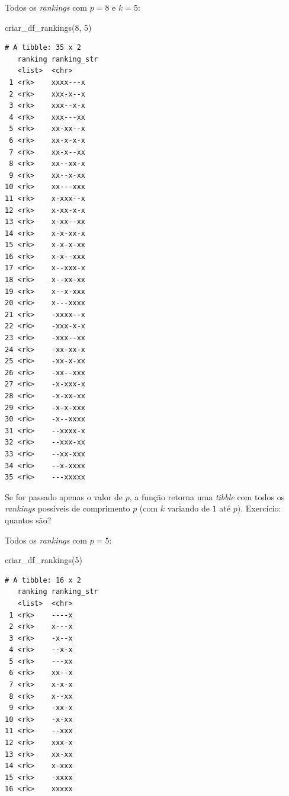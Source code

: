 \documentclass[
  letterpaper,
  DIV=11,
  numbers=noendperiod]{scrreprt}
\newenvironment{Shaded}{\begin{snugshade}}{\end{snugshade}}
\newcommand{\DecValTok}[1]{\textcolor[rgb]{0.68,0.00,0.00}{#1}}
\newcommand{\FunctionTok}[1]{\textcolor[rgb]{0.28,0.35,0.67}{#1}}
\newcommand{\NormalTok}[1]{\textcolor[rgb]{0.00,0.23,0.31}{#1}}
\begin{document}
Todos os \emph{rankings} com $p = 8$ e $k = 5$:

\begin{Shaded}
\begin{Highlighting}[]
\FunctionTok{criar\_df\_rankings}\NormalTok{(}\DecValTok{8}\NormalTok{, }\DecValTok{5}\NormalTok{)}
\end{Highlighting}
\end{Shaded}

\begin{verbatim}
# A tibble: 35 x 2
   ranking ranking_str
   <list>  <chr>      
 1 <rk>    xxxx---x   
 2 <rk>    xxx-x--x   
 3 <rk>    xxx--x-x   
 4 <rk>    xxx---xx   
 5 <rk>    xx-xx--x   
 6 <rk>    xx-x-x-x   
 7 <rk>    xx-x--xx   
 8 <rk>    xx--xx-x   
 9 <rk>    xx--x-xx   
10 <rk>    xx---xxx   
11 <rk>    x-xxx--x   
12 <rk>    x-xx-x-x   
13 <rk>    x-xx--xx   
14 <rk>    x-x-xx-x   
15 <rk>    x-x-x-xx   
16 <rk>    x-x--xxx   
17 <rk>    x--xxx-x   
18 <rk>    x--xx-xx   
19 <rk>    x--x-xxx   
20 <rk>    x---xxxx   
21 <rk>    -xxxx--x   
22 <rk>    -xxx-x-x   
23 <rk>    -xxx--xx   
24 <rk>    -xx-xx-x   
25 <rk>    -xx-x-xx   
26 <rk>    -xx--xxx   
27 <rk>    -x-xxx-x   
28 <rk>    -x-xx-xx   
29 <rk>    -x-x-xxx   
30 <rk>    -x--xxxx   
31 <rk>    --xxxx-x   
32 <rk>    --xxx-xx   
33 <rk>    --xx-xxx   
34 <rk>    --x-xxxx   
35 <rk>    ---xxxxx   
\end{verbatim}

Se for passado apenas o valor de $p$, a função retorna uma \emph{tibble}
com todos os \emph{rankings} possíveis de comprimento $p$ (com $k$
variando de $1$ até $p$). Exercício: quantos são?

Todos os \emph{rankings} com $p = 5$:

\begin{Shaded}
\begin{Highlighting}[]
\FunctionTok{criar\_df\_rankings}\NormalTok{(}\DecValTok{5}\NormalTok{)}
\end{Highlighting}
\end{Shaded}

\begin{verbatim}
# A tibble: 16 x 2
   ranking ranking_str
   <list>  <chr>      
 1 <rk>    ----x      
 2 <rk>    x---x      
 3 <rk>    -x--x      
 4 <rk>    --x-x      
 5 <rk>    ---xx      
 6 <rk>    xx--x      
 7 <rk>    x-x-x      
 8 <rk>    x--xx      
 9 <rk>    -xx-x      
10 <rk>    -x-xx      
11 <rk>    --xxx      
12 <rk>    xxx-x      
13 <rk>    xx-xx      
14 <rk>    x-xxx      
15 <rk>    -xxxx      
16 <rk>    xxxxx      
\end{verbatim}
\end{document}
